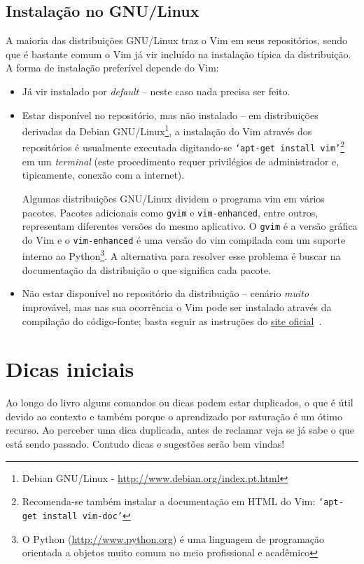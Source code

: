 \subsection{Instalação no GNU/Linux}
%
A maioria das distribuições GNU/Linux traz o Vim em seus repositórios, sendo
que é bastante comum o Vim já vir incluído na instalação típica da distribuição.
A forma de instalação preferível depende do Vim:
\begin{itemize}
\item Já vir instalado por {\em default} -- neste caso nada precisa ser feito.

\item Estar disponível no repositório, mas não instalado -- em distribuições
derivadas da Debian GNU/Linux\footnote{Debian GNU/Linux - \url{http://www.debian.org/index.pt.html}},
a instalação do Vim através dos repositórios é usualmente executada
digitando-se {\tt `apt-get install vim'}\footnote{Recomenda-se também instalar
a documentação em HTML do Vim: {\tt `apt-get install vim-doc'}} em um {\em terminal} (este procedimento
requer privilégios de administrador e, tipicamente, conexão com a internet).
 
Algumas distribuições GNU/Linux dividem o programa vim em vários pacotes. 
Pacotes adicionais como \texttt{gvim} e \texttt{vim-enhanced}, entre outros,
representam diferentes versões do mesmo aplicativo. O  \texttt{gvim} é a versão
gráfica do Vim e o \texttt{vim-enhanced} é uma versão do vim compilada com um
suporte interno ao Python\footnote{O Python (\url{http://www.python.org}) é uma
linguagem de programação orientada a objetos muito comum no meio profissional e
acadêmico}.
A alternativa para resolver esse problema é buscar na documentação da 
distribuição o que significa cada pacote.

\item Não estar disponível no repositório da distribuição -- cenário {\em muito}
improvável, mas nas sua ocorrência o Vim pode ser instalado através da compilação do
código-fonte; basta seguir as instruções do 
\href{http://www.vim.org/download.php}{site oficial}~\cite{SiteOficialDownloads}.

\end{itemize}

\section{Dicas iniciais}\label{Dicas iniciais}
%
Ao longo do livro alguns comandos ou dicas podem estar duplicados, o que
é útil devido ao contexto e também porque o aprendizado por saturação
é um ótimo recurso. Ao perceber uma dica duplicada, antes de
reclamar veja se já sabe o que está sendo passado. %
Contudo dicas e sugestões serão bem vindas! 

